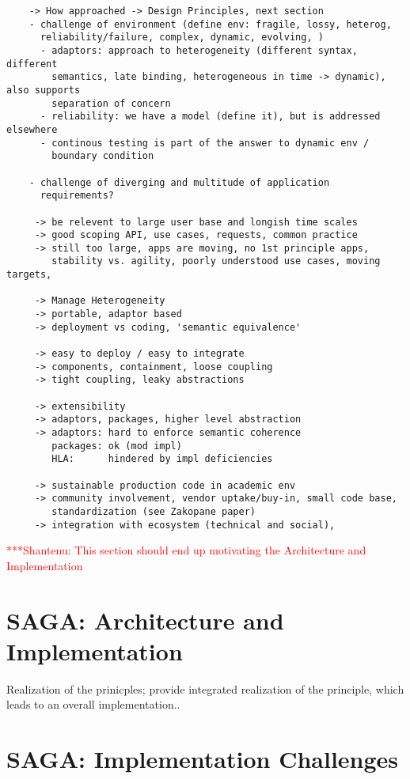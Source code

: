 \documentclass[a4paper,10pt]{article}
\newcommand{\jhanote}[1]{  {\textcolor{red}  { ***Shantenu: #1 }}}
\newcommand{\jhanote}[1]{}
\begin{document}
\begin{verbatim}
    -> How approached -> Design Principles, next section
    - challenge of environment (define env: fragile, lossy, heterog,
      reliability/failure, complex, dynamic, evolving, ) 
      - adaptors: approach to heterogeneity (different syntax, different
        semantics, late binding, heterogeneous in time -> dynamic), also supports 
        separation of concern
      - reliability: we have a model (define it), but is addressed elsewhere
      - continous testing is part of the answer to dynamic env /
        boundary condition

    - challenge of diverging and multitude of application
      requirements?

     -> be relevent to large user base and longish time scales
     -> good scoping API, use cases, requests, common practice
     -> still too large, apps are moving, no 1st principle apps,
        stability vs. agility, poorly understood use cases, moving targets, 

     -> Manage Heterogeneity
     -> portable, adaptor based
     -> deployment vs coding, 'semantic equivalence'
  
     -> easy to deploy / easy to integrate
     -> components, containment, loose coupling
     -> tight coupling, leaky abstractions
  
     -> extensibility
     -> adaptors, packages, higher level abstraction
     -> adaptors: hard to enforce semantic coherence
        packages: ok (mod impl)
        HLA:      hindered by impl deficiencies
  
     -> sustainable production code in academic env
     -> community involvement, vendor uptake/buy-in, small code base,
        standardization (see Zakopane paper)
     -> integration with ecosystem (technical and social), 
   \end{verbatim}

\jhanote{This section should end up motivating the Architecture and
 Implementation}

\section{SAGA: Architecture and Implementation}

Realization of the prinicples; provide integrated realization of the
 principle, which leads to an overall implementation..

\section{SAGA: Implementation Challenges}
\end{document}
